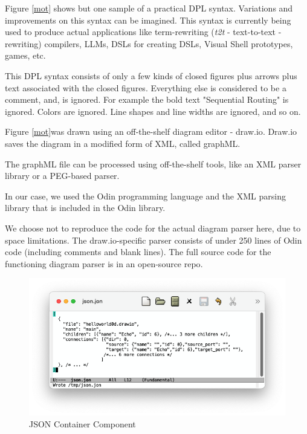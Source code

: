 \documentclass[10pt,anonymous,review]{acmart}
\begin{document}
Figure \ref{mot} shows but one sample of a practical DPL syntax. Variations and
improvements on this syntax can be imagined. This syntax is currently being used
to produce actual applications like term-rewriting (\emph{t2t} -
text-to-text - rewriting) compilers, LLMs, DSLs for creating DSLs,
Visual Shell prototypes, games, etc.

This DPL syntax consists of only a few kinds of closed figures plus
arrows plus text associated with the closed figures. Everything else is
considered to be a comment, and, is ignored. For example the bold text
"Sequential Routing" is ignored. Colors are ignored. Line shapes and
line widths are ignored, and so on.

Figure \ref{mot}was drawn using an off-the-shelf diagram editor -
draw.io\cite{diagrams_net}. Draw.io saves the diagram in a modified form of XML, called graphML\cite{graphml}.

The graphML file can be processed using off-the-shelf tools, like an XML parser library or a PEG\cite{peg}-based parser\cite{ohmjs}.

In our case, we used the Odin programming language\cite{odin} and the XML parsing library that is included in the Odin library.

We choose not to reproduce the code for the actual diagram parser here, due to space limitations. The draw.io-specific parser consists of under 250 lines of Odin code (including comments and blank lines). The full source code for the functioning diagram parser is in an open-source repo\cite{d2j}.

  \begin{figure}
    \includegraphics[scale=0.4]{./media/json.png}
    \caption{JSON Container Component}
    \label{json}
  \end{figure}
\end{document}
